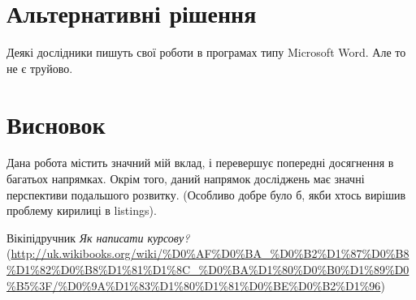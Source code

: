 \documentclass[a4paper,14pt]{extreport}
\begin{document}
	
	
	\chapter{Альтернативні рішення} 
	Деякі дослідники пишуть свої роботи в програмах типу Microsoft Word. Але то не є труйово\cite{howto}.
	
	
	\chapter{Висновок} 
	Дана робота містить значний мій вклад, і перевершує попередні досягнення в багатьох напрямках. Окрім того, даний напрямок досліджень має значні перспективи
	подальшого розвитку. (Особливо добре було б, якби хтось вирішив проблему кирилиці в listings).
	
	
	\newpage
	\begin{thebibliography}{9}
		
		 Вікіпідручник \emph{Як написати курсову?}
		(\url{http://uk.wikibooks.org/wiki/%D0%AF%D0%BA_%D0%B2%D1%87%D0%B8%D1%82%D0%B8%D1%81%D1%8C_%D0%BA%D1%80%D0%B0%D1%89%D0%B5%3F/%D0%9A%D1%83%D1%80%D1%81%D0%BE%D0%B2%D1%96})
			
		\end{thebibliography}
	
\end{document}
